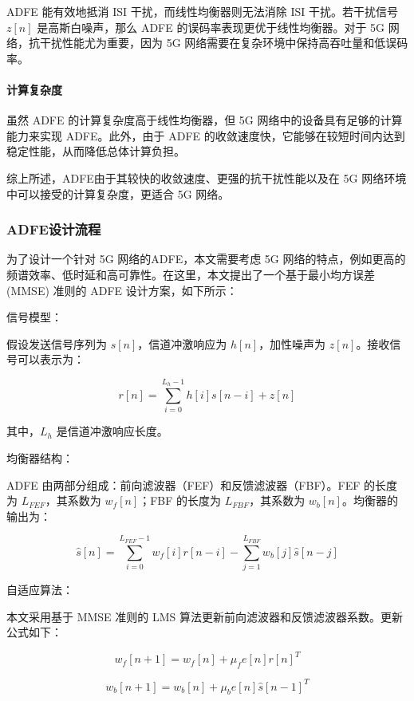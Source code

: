 \documentclass[UTF8,a4paper,12pt]{ctexart}
\numberwithin{equation}{section}
\begin{document}
	ADFE 能有效地抵消 ISI 干扰，而线性均衡器则无法消除 ISI 干扰。若干扰信号 $z[n]$ 是高斯白噪声，那么 ADFE 的误码率表现更优于线性均衡器。对于 5G 网络，抗干扰性能尤为重要，因为 5G 网络需要在复杂环境中保持高吞吐量和低误码率。
	
	\paragraph{计算复杂度}
	虽然 ADFE 的计算复杂度高于线性均衡器，但 5G 网络中的设备具有足够的计算能力来实现 ADFE。此外，由于 ADFE 的收敛速度快，它能够在较短时间内达到稳定性能，从而降低总体计算负担。
	
	综上所述，ADFE由于其较快的收敛速度、更强的抗干扰性能以及在 5G 网络环境中可以接受的计算复杂度，更适合 5G 网络。
	\subsubsection{ADFE设计流程}
	为了设计一个针对 5G 网络的ADFE，本文需要考虑 5G 网络的特点，例如更高的频谱效率、低时延和高可靠性。在这里，本文提出了一个基于最小均方误差 (MMSE) 准则的 ADFE 设计方案，如下所示：
	
	信号模型：
	
	假设发送信号序列为 $s[n]$，信道冲激响应为 $h[n]$，加性噪声为 $z[n]$。接收信号可以表示为：
	
	\begin{equation}
		r[n] = \sum_{i=0}^{L_h-1} h[i]s[n-i] + z[n]
	\end{equation}
	
	其中，$L_h$ 是信道冲激响应长度。
	
	均衡器结构：
	
	ADFE 由两部分组成：前向滤波器（FEF）和反馈滤波器（FBF）。FEF 的长度为 $L_{FEF}$，其系数为 $w_f[n]$；FBF 的长度为 $L_{FBF}$，其系数为 $w_b[n]$。均衡器的输出为：
	
	\begin{equation}
		\hat{s}[n] = \sum_{i=0}^{L_{FEF}-1} w_f[i]r[n-i] - \sum_{j=1}^{L_{FBF}} w_b[j] \hat{s}[n-j]
	\end{equation}
	
	自适应算法：
	
	本文采用基于 MMSE 准则的 LMS 算法更新前向滤波器和反馈滤波器系数。更新公式如下：
	
	\begin{equation}
		w_f[n+1] = w_f[n] + \mu_f e[n] r[n]^{T}
	\end{equation}
	
	\begin{equation}
		w_b[n+1] = w_b[n] + \mu_b e[n] \hat{s}[n-1]^{T}
	\end{equation}
	
\end{document}

